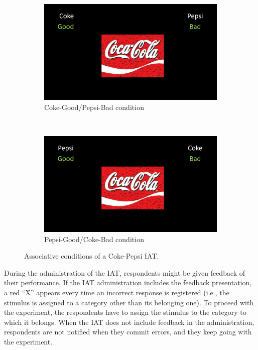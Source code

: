\documentclass[12pt]{book}
\begin{document}
\begin{figure}[h!]
	\centering
	\begin{subfigure}[b]{0.4\linewidth}
		\includegraphics[width=\linewidth]{cocagood.png}
		\caption{Coke-Good/Pepsi-Bad condition}
		\label{cgpb}
	\end{subfigure}
	~ %
	\begin{subfigure}[b]{0.4\linewidth}
		\includegraphics[width=\linewidth]{cocabad.png}
		\caption{Pepsi-Good/Coke-Bad condition}
	\end{subfigure}
	\caption{\label{fig:IAT} Associative conditions of a Coke-Pepsi IAT.}
\end{figure}



During the administration of the IAT, respondents might be given feedback of their performance. If the IAT administration includes the feedback presentation, a red ``X'' appears every time an incorrect response is registered (i.e., the stimulus is assigned to a category other than its belonging one). To proceed with the experiment, the respondents have to assign the stimulus to the category to which it belongs. When the IAT does not include feedback in the administration, respondents are not notified when they commit errors, and they keep going with the experiment. 
\end{document}

